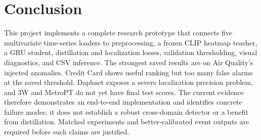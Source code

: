 \documentclass[twoside,english]{article}
\begin{document}
\section{Conclusion} \label{sec:conclusion}
This project implements a complete research prototype that connects five multivariate time-series loaders to preprocessing, a frozen CLIP heatmap teacher, a GRU student, distillation and localization losses, validation thresholding, visual diagnostics, and CSV inference. The strongest saved results are on Air Quality's injected anomalies. Credit Card shows useful ranking but too many false alarms at the saved threshold. Daphnet exposes a severe localization precision problem, and 3W and MetroPT do not yet have final test scores. The current evidence therefore demonstrates an end-to-end implementation and identifies concrete failure modes; it does not establish a robust cross-domain detector or a benefit from distillation. Matched experiments and better-calibrated event outputs are required before such claims are justified.
\end{document}

